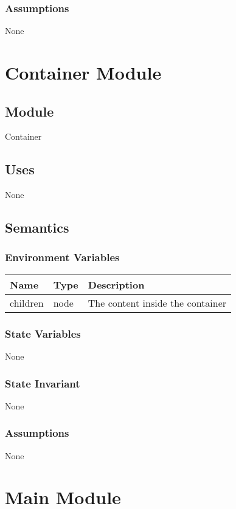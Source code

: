 \documentclass[12pt]{article}
\begin{document}
\subsubsection{Assumptions}
None

\newpage

\section{Container Module}

\subsection{Module}
Container

\subsection{Uses}
None

\subsection{Semantics}

\subsubsection{Environment Variables}
\begin{tabular}{| l | l | p{10cm} |}
    \hline
    \textbf{Name} & \textbf{Type} & \textbf{Description}\\ \hline
    children & node & The content inside the container\\ \hline
\end{tabular}

\subsubsection{State Variables}
None

\subsubsection{State Invariant}
None

\subsubsection{Assumptions}
None

\newpage


\section{Main Module}
\end{document}
